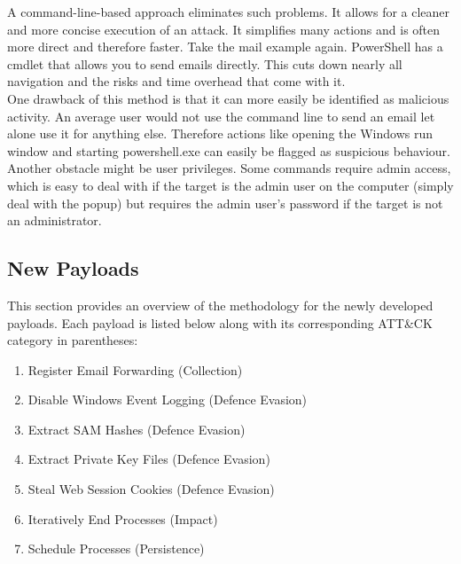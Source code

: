 A command-line-based approach eliminates such problems. It allows for a cleaner and more concise execution of an attack. It simplifies many actions and is often more direct and therefore faster. Take the mail example again. PowerShell has a cmdlet that allows you to send emails directly. This cuts down nearly all navigation and the risks and time overhead that come with it. \\
One drawback of this method is that it can more easily be identified as malicious activity. An average user would not use the command line to send an email let alone use it for anything else. Therefore actions like opening the Windows run window and starting powershell.exe can easily be flagged as suspicious behaviour. Another obstacle might be user privileges. Some commands require admin access, which is easy to deal with if the target is the admin user on the computer (simply deal with the popup) but requires the admin user's password if the target is not an administrator. 


\subsection{New Payloads}

This section provides an overview of the methodology for the newly developed payloads. Each payload is listed below along with its corresponding ATT\&CK category in parentheses:
\begin{enumerate}
    \item Register Email Forwarding (Collection)
    \item Disable Windows Event Logging (Defence Evasion)
    \item Extract SAM Hashes (Defence Evasion)
    \item Extract Private Key Files (Defence Evasion)
    \item Steal Web Session Cookies (Defence Evasion)
    \item Iteratively End Processes (Impact)
    \item Schedule Processes (Persistence)
\end{enumerate}


